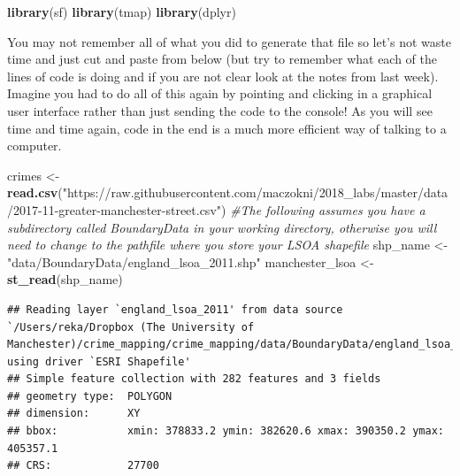 \documentclass[]{book}
\newenvironment{Shaded}{\begin{snugshade}}{\end{snugshade}}
\newcommand{\CommentTok}[1]{\textcolor[rgb]{0.56,0.35,0.01}{\textit{#1}}}
\newcommand{\DataTypeTok}[1]{\textcolor[rgb]{0.13,0.29,0.53}{#1}}
\newcommand{\KeywordTok}[1]{\textcolor[rgb]{0.13,0.29,0.53}{\textbf{#1}}}
\newcommand{\NormalTok}[1]{#1}
\newcommand{\OperatorTok}[1]{\textcolor[rgb]{0.81,0.36,0.00}{\textbf{#1}}}
\newcommand{\StringTok}[1]{\textcolor[rgb]{0.31,0.60,0.02}{#1}}
\begin{document}
\begin{Shaded}
\begin{Highlighting}[]
\KeywordTok{library}\NormalTok{(sf)}
\KeywordTok{library}\NormalTok{(tmap)}
\KeywordTok{library}\NormalTok{(dplyr)}
\end{Highlighting}
\end{Shaded}

You may not remember all of what you did to generate that file so let's not waste time and just cut and paste from below (but try to remember what each of the lines of code is doing and if you are not clear look at the notes from last week). Imagine you had to do all of this again by pointing and clicking in a graphical user interface rather than just sending the code to the console! As you will see time and time again, code in the end is a much more efficient way of talking to a computer.

\begin{Shaded}
\begin{Highlighting}[]
\NormalTok{crimes <-}\StringTok{ }\KeywordTok{read.csv}\NormalTok{(}\StringTok{"https://raw.githubusercontent.com/maczokni/2018_labs/master/data/2017-11-greater-manchester-street.csv"}\NormalTok{)}
\CommentTok{#The following assumes you have a subdirectory called BoundaryData in your working directory, otherwise you will need to change to the pathfile where you store your LSOA shapefile}
\NormalTok{shp_name <-}\StringTok{ "data/BoundaryData/england_lsoa_2011.shp"}
\NormalTok{manchester_lsoa <-}\StringTok{ }\KeywordTok{st_read}\NormalTok{(shp_name)}
\end{Highlighting}
\end{Shaded}

\begin{verbatim}
## Reading layer `england_lsoa_2011' from data source `/Users/reka/Dropbox (The University of Manchester)/crime_mapping/crime_mapping/data/BoundaryData/england_lsoa_2011.shp' using driver `ESRI Shapefile'
## Simple feature collection with 282 features and 3 fields
## geometry type:  POLYGON
## dimension:      XY
## bbox:           xmin: 378833.2 ymin: 382620.6 xmax: 390350.2 ymax: 405357.1
## CRS:            27700
\end{verbatim}

\begin{Shaded}
\end{Shaded}
\end{document}
